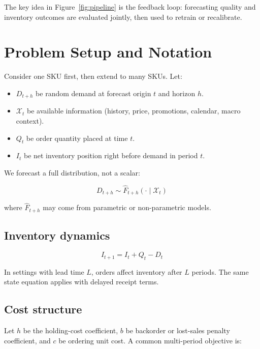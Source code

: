 \documentclass[11pt,a4paper]{article}
\begin{document}
The key idea in Figure~\ref{fig:pipeline} is the feedback loop: forecasting quality and inventory outcomes are evaluated jointly, then used to retrain or recalibrate.

\section{Problem Setup and Notation}

Consider one SKU first, then extend to many SKUs. Let:

\begin{itemize}
    \item $D_{t+h}$ be random demand at forecast origin $t$ and horizon $h$.
    \item $\mathcal{X}_t$ be available information (history, price, promotions, calendar, macro context).
    \item $Q_t$ be order quantity placed at time $t$.
    \item $I_t$ be net inventory position right before demand in period $t$.
\end{itemize}

We forecast a full distribution, not a scalar:

\begin{equation}
D_{t+h} \sim \hat{F}_{t+h}(\cdot \mid \mathcal{X}_t)
\label{eq:forecast_dist}
\end{equation}

where $\hat{F}_{t+h}$ may come from parametric or non-parametric models.

\subsection{Inventory dynamics}

\begin{equation}
I_{t+1} = I_t + Q_t - D_t
\label{eq:inventory_dynamics}
\end{equation}

In settings with lead time $L$, orders affect inventory after $L$ periods. The same state equation applies with delayed receipt terms.

\subsection{Cost structure}

Let $h$ be the holding-cost coefficient, $b$ be backorder or lost-sales penalty coefficient, and $c$ be ordering unit cost. A common multi-period objective is:
\end{document}
